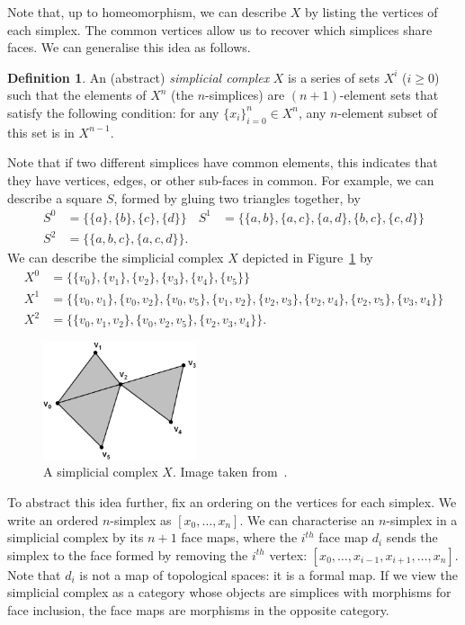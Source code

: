 \documentclass[a4paper,11pt,leqno]{article} \usepackage{amsmath}
\theoremstyle{definition}
\newtheorem{defn}{Definition}
\begin{document}
Note that, up to homeomorphism, we can describe $X$ by listing the vertices of
each simplex.
The common vertices allow us to recover which simplices share faces.
We can generalise this idea as follows.

\begin{defn}
  An (abstract) \emph{simplicial complex} $X$ is a series of sets $X^i$ ($i\geq
  0$) such that the elements of $X^n$ (the $n$-simplices) are $(n+1)$-element
  sets that satisfy the following condition: for any $\{x_i\}_{i=0}^n\in X^n$,
  any $n$-element subset of this set is in $X^{n-1}$.
\end{defn}

Note that if two different simplices have common elements, this indicates that
they have vertices, edges, or other sub-faces in common.
For example, we can describe a square $S$, formed by gluing two triangles
together, by
\begin{align*}
  S^0	&=
  \{\{a\},\{b\},\{c\},\{d\}\} & S^1	&= \{\{a, b\}, \{a, c\}, \{a, d\}, \{b, c\},
  \{c, d\}\}\\ S^2	&= \{\{a,b,c\}, \{a,c,d\}\}.
\end{align*}
We can describe the
simplicial complex $X$ depicted in Figure~\ref{fig_simplicial_complex} by
\begin{align*}
  X^0	&= \{\{v_0\}, \{v_1\}, \{v_2\}, \{v_3\}, \{v_4\},
  \{v_5\}\}\\ X^1	&= \{\{v_0, v_1\}, \{v_0, v_2\}, \{v_0, v_5\}, \{v_1, v_2\},
  \{v_2, v_3\}, \{v_2, v_4\}, \{v_2, v_5\}, \{v_3, v_4\}\}\\ X^2	&= \{\{v_0,
  v_1, v_2\}, \{v_0, v_2, v_5\}, \{v_2, v_3, v_4\}\}.
\end{align*}

\begin{figure} \centering
  \includegraphics[width=0.4\textwidth]{figures/simp1.jpg} \caption{A simplicial
  complex $X$.
  Image taken from~\cite{Friedman08}.} \label{fig_simplicial_complex}
\end{figure}

To abstract this idea further, fix an ordering on the vertices for each
simplex.
We write an ordered $n$-simplex as $[x_0,\ldots,x_n]$.
We can characterise an $n$-simplex in a simplicial complex by its $n+1$ face
maps, where the $i^{th}$ face map $d_i$ sends the simplex to the face formed by
removing the $i^{th}$ vertex: $[x_0,\ldots,x_{i-1},x_{i+1},\dots,x_n]$.
Note that $d_i$ is not a map of topological spaces: it is a formal map.
If we view the simplicial complex as a category whose objects are simplices
with morphisms for face inclusion, the face maps are morphisms in the opposite
category.
\end{document}
